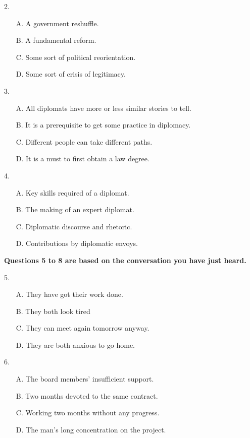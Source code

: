 \documentclass[UTF8,11pt]{ctexart}
\begin{document}
2.


\begin{itemize}[leftmargin=2em,itemsep=.2em,topsep=.4em]\item[A.] A government reshuffle.
\item[B.] A fundamental reform.
\item[C.] Some sort of political reorientation.
\item[D.] Some sort of crisis of legitimacy.
\end{itemize}

3.


\begin{itemize}[leftmargin=2em,itemsep=.2em,topsep=.4em]\item[A.] All diplomats have more or less similar stories to tell.
\item[B.] It is a prerequisite to get some practice in diplomacy.
\item[C.] Different people can take different paths.
\item[D.] It is a must to first obtain a law degree.
\end{itemize}

4.


\begin{itemize}[leftmargin=2em,itemsep=.2em,topsep=.4em]\item[A.] Key skills required of a diplomat.
\item[B.] The making of an expert diplomat.
\item[C.] Diplomatic discourse and rhetoric.
\item[D.] Contributions by diplomatic envoys.
\end{itemize}

\textbf{Questions 5 to 8 are based on the conversation you have just heard.}


5.


\begin{itemize}[leftmargin=2em,itemsep=.2em,topsep=.4em]\item[A.] They have got their work done.
\item[B.] They both look tired
\item[C.] They can meet again tomorrow anyway.
\item[D.] They are both anxious to go home.
\end{itemize}

6.


\begin{itemize}[leftmargin=2em,itemsep=.2em,topsep=.4em]\item[A.] The board members’ insufficient support.
\item[B.] Two months devoted to the same contract.
\item[C.] Working two months without any progress.
\item[D.] The man’s long concentration on the project.
\end{itemize}
\end{document}
